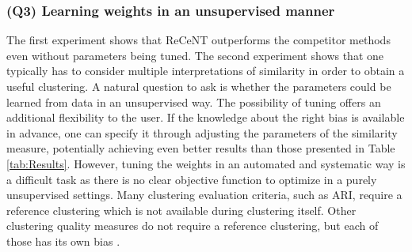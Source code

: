 \vspace{2pt}









\subsubsection{\textbf{(Q3) Learning weights in an unsupervised manner}}

The first experiment shows that ReCeNT outperforms the competitor methods even without parameters being tuned.
The second experiment shows that one typically has to consider multiple interpretations of similarity in order to obtain a useful clustering.
A natural question to ask is whether the  parameters could be learned from data in an unsupervised way.
The possibility of tuning offers an additional flexibility to the user.
If the knowledge about the right bias is available in advance, one can specify it through adjusting the parameters of the similarity measure, potentially achieving even better results than those presented in Table \ref{tab:Results}.
However, tuning the weights in an automated and systematic way is a difficult task as there is no clear objective function to optimize in a purely unsupervised settings.
Many clustering evaluation criteria, such as ARI, require a reference clustering which is not available during clustering itself.  Other clustering quality measures do not require a reference clustering, but each of those has its own bias \cite{VanCraenendonck15}.
\vspace{2pt}

